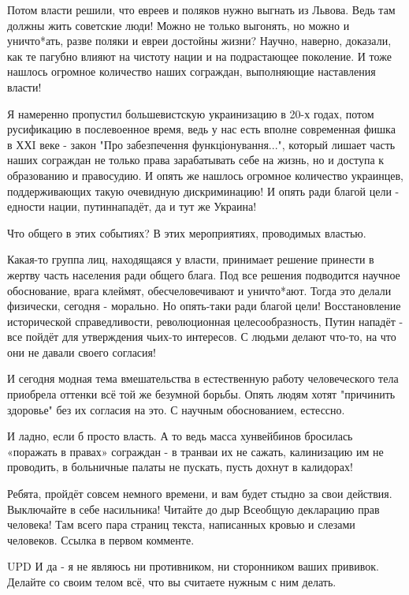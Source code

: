 Потом власти решили, что евреев и поляков нужно выгнать из Львова. Ведь там
должны жить советские люди! Можно не только выгонять, но можно и уничто*ать,
разве поляки и евреи достойны жизни? Научно, наверно, доказали, как те пагубно
влияют на чистоту нации и на подрастающее поколение. И тоже нашлось огромное
количество наших сограждан, выполняющие наставления власти!

Я намеренно пропустил большевистскую украинизацию  в 20-х годах, потом
русификацию в послевоенное время, ведь у нас есть вполне современная фишка в
ХХI веке - закон "Про забезпечення функціонування...", который лишает часть
наших сограждан не только права зарабатывать себе на жизнь, но и доступа к
образованию и правосудию. И опять же нашлось огромное количество украинцев,
поддерживающих такую очевидную дискриминацию! И опять ради благой цели -
едности нации, путиннападёт, да и тут же Украина!

Что общего в этих событиях? В этих мероприятиях, проводимых властью.

Какая-то группа лиц, находящаяся у власти, принимает решение принести в жертву
часть населения ради общего блага. Под все решения подводится научное
обоснование, врага клеймят, обесчеловечивают и уничто*ают. Тогда это делали
физически, сегодня - морально. Но опять-таки ради благой цели! Восстановление
исторической справедливости, революционная целесообразность, Путин нападёт -
все пойдёт для утверждения чьих-то интересов. С людьми делают что-то, на что
они не давали своего согласия!

И сегодня модная тема вмешательства в естественную работу человеческого тела
приобрела оттенки всё той же безумной борьбы. Опять людям хотят "причинить
здоровье" без их согласия на это. С научным обоснованием, естессно.

И ладно, если б просто власть. А то ведь масса хунвейбинов бросилась «поражать
в правах» сограждан - в транваи их не сажать, калинизацию им не проводить, в
больничные палаты не пускать, пусть дохнут в калидорах!  

Ребята, пройдёт совсем немного времени, и вам будет стыдно за свои действия.
Выключайте в себе насильника! Читайте до дыр Всеобщую декларацию прав человека!
Там всего пара страниц текста, написанных кровью и слезами человеков. Ссылка в
первом комменте.

UPD И да - я не являюсь ни противником, ни сторонником ваших прививок. Делайте
со своим телом всё, что вы считаете нужным с ним делать.

